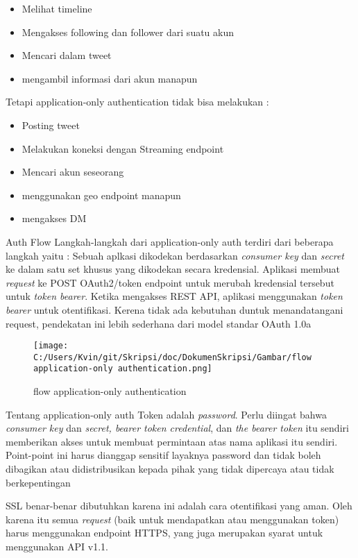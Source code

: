 \begin{itemize}
	\item Melihat timeline
	\item Mengakses following dan follower dari suatu akun
	\item Mencari dalam tweet
	\item mengambil informasi dari akun manapun
\end{itemize}


Tetapi application-only authentication tidak bisa melakukan :

\begin{itemize}
	\item Posting tweet
	\item Melakukan koneksi dengan Streaming endpoint
	\item Mencari akun seseorang
	\item menggunakan geo endpoint manapun
	\item mengakses DM
\end{itemize}

Auth Flow
Langkah-langkah dari application-only auth terdiri dari beberapa langkah yaitu :
Sebuah aplkasi dikodekan berdasarkan \textit{consumer key} dan \textit{secret} ke dalam satu set khusus yang dikodekan secara kredensial.
Aplikasi membuat \textit{request} ke POST OAuth2/token endpoint untuk merubah kredensial tersebut untuk \textit{token bearer}.
Ketika mengakses REST API, aplikasi menggunakan \textit{token bearer} untuk otentifikasi.
Kerena tidak ada kebutuhan duntuk menandatangani request, pendekatan ini lebih sederhana dari model standar OAuth 1.0a

\begin{figure}
	\centering
		\texttt{[image: C:/Users/Kvin/git/Skripsi/doc/DokumenSkripsi/Gambar/flow application-only authentication.png]}
	\caption{flow application-only authentication}
	\label{fig:flow application-only authentication}
\end{figure}


Tentang application-only auth
Token adalah \textit{password}. Perlu diingat bahwa \textit{consumer key} dan \textit{secret, bearer token credential}, dan \textit{the bearer token} itu sendiri memberikan akses untuk membuat permintaan atas nama aplikasi itu sendiri. Point-point ini harus dianggap sensitif layaknya password dan tidak boleh dibagikan atau didistribusikan kepada pihak yang tidak dipercaya atau tidak berkepentingan

SSL benar-benar dibutuhkan karena ini adalah cara otentifikasi yang aman. Oleh karena itu semua \textit{request} (baik untuk mendapatkan atau menggunakan token) harus menggunakan endpoint HTTPS, yang juga merupakan syarat untuk menggunakan API v1.1.

